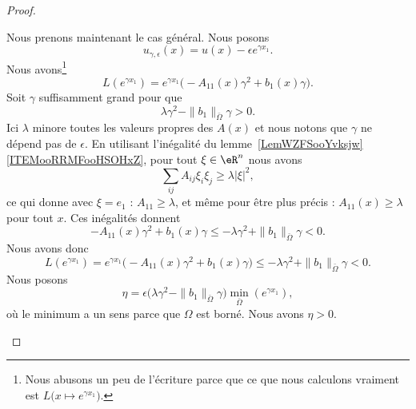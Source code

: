\begin{proof}
\begin{subproof}
		Nous prenons maintenant le cas général. Nous posons
		\begin{equation}
			u_{\gamma,\epsilon}(x)=u(x)-\epsilon e^{\gamma x_1}.
		\end{equation}
		Nous avons\footnote{Nous abusons un peu de l'écriture parce que ce que nous calculons vraiment est \( L\big( x\mapsto  e^{\gamma x_1} \big)\).}
		\begin{equation}
			L( e^{\gamma x_1})= e^{\gamma x_1}\big( -A_{11}(x)\gamma^2+b_1(x)\gamma \big).
		\end{equation}
		Soit \( \gamma\) suffisamment grand pour que
		\begin{equation}
			\lambda\gamma^2-\| b_1 \|_{\bar \Omega}\gamma>0.
		\end{equation}
		Ici \( \lambda\) minore toutes les valeurs propres des \( A(x)\) et nous notons que \( \gamma\) ne dépend pas de \( \epsilon\). En utilisant l'inégalité du lemme~\ref{LemWZFSooYvksjw}\ref{ITEMooRRMFooHSOHxZ}, pour tout \( \xi\in \eR^n\) nous avons
		\begin{equation}
			\sum_{ij}A_{ij}\xi_i\xi_j\geq \lambda| \xi |^2,
		\end{equation}
		ce qui donne avec \( \xi=e_1\) : \( A_{11}\geq \lambda\), et même pour être plus précis : \( A_{11}(x)\geq \lambda\) pour tout \( x\). Ces inégalités donnent
		\begin{equation}
			-A_{11}(x)\gamma^2+b_1(x)\gamma\leq -\lambda\gamma^2+\| b_1 \|_{\bar \Omega}\gamma<0.
		\end{equation}
		Nous avons donc
		\begin{equation}        \label{EQooXCGQooLGMnvL}
			L( e^{\gamma x_1})= e^{\gamma x_1}\big( -A_{11}(x)\gamma^2+b_1(x)\gamma \big)\leq  -\lambda\gamma^2+\| b_1 \|_{\bar \Omega}\gamma<0.
		\end{equation}
		Nous posons
		\begin{equation}
			\eta=\epsilon\big( \lambda\gamma^2-\| b_1 \|_{\bar\Omega}\gamma \big)\min_{\bar \Omega}( e^{\gamma x_1}),
		\end{equation}
		où le minimum a un sens parce que \( \Omega\) est borné. Nous avons \( \eta>0\).


\end{subproof}
\end{proof}
